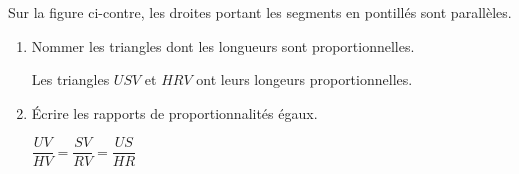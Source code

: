     \phantom{rrr}

    \begin{minipage}{0.3\linewidth}
    \end{minipage}
    \begin{minipage}{0.6\linewidth}
         Sur la figure ci-contre, les droites portant les segments en pontillés sont parallèles.

        \begin{enumerate}
            \item Nommer les triangles dont les longueurs sont proportionnelles.

            {\color{red} Les triangles $USV$ et $HRV$ ont leurs longeurs proportionnelles.}
            \item Écrire les rapports de proportionnalités égaux.

            \smallskip
            {\color{red} $\dfrac{UV}{HV} = \dfrac{SV}{RV} = \dfrac{US}{HR}$}
        \end{enumerate}
    \end{minipage}

